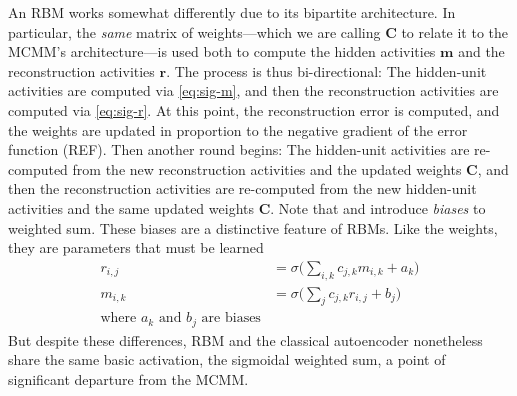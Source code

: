 An RBM works somewhat differently due to its bipartite architecture. In particular, the \emph{same} matrix of weights---which we are calling $\textbf{C}$ to relate it to the MCMM's architecture---is used both to compute the hidden activities $\textbf{m}$ and the
reconstruction activities $\textbf{r}$. The process is thus bi-directional: The hidden-unit activities are computed via \eqref{eq:sig-m}, and then the reconstruction activities are computed via \eqref{eq:sig-r}. At this point, the reconstruction error is computed, and the weights are updated in proportion to the negative gradient of the error function (REF). Then another round begins: The hidden-unit activities are re-computed from the new reconstruction activities and the updated weights $\textbf{C}$, and then  the reconstruction activities are re-computed from the new hidden-unit activities and the same updated weights $\textbf{C}$. Note that \label{eq:sig-r} and  \label{eq:sig-m} introduce \emph{biases} to weighted sum. These biases are a distinctive feature of RBMs. Like the weights, they are parameters that must be learned
\begin{align}
\label{eq:sig-r}
r_{i,j} &= \sigma\big(\sum_{i,k} c_{j,k} m_{i,k} + a_{k}\big) \\
\label{eq:sig-m}
m_{i,k} &= \sigma\big(\sum_{j} c_{j,k} r_{i,j} + b_{j}\big) \\
\text{where $a_{k}$ and $b_{j}$ are biases}
\end{align}
But despite these differences, RBM and the classical autoencoder nonetheless share 
the same basic activation, the sigmoidal weighted sum, a point of significant departure from the MCMM.


